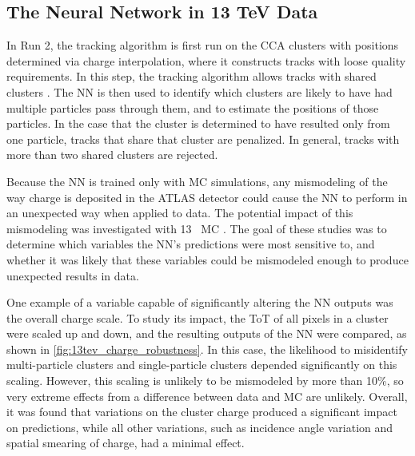 \subsection{The Neural Network in 13 TeV Data}

In Run 2, the tracking algorithm is first run on the \ac{CCA} clusters with positions determined via charge interpolation, where it constructs tracks with loose quality requirements. In this step, the tracking algorithm allows tracks with shared clusters \cite{ATL-PHYS-PUB-2015-044}. The \ac{NN} is then used to identify which clusters are likely to have had multiple particles pass through them, and to estimate the positions of those particles. In the case that the cluster is determined to have resulted only from one particle, tracks that share that cluster are penalized. In general, tracks with more than two shared clusters are rejected.

Because the \ac{NN} is trained only with \ac{MC} simulations, any mismodeling of the way charge is deposited in the \ac{ATLAS} detector could cause the \ac{NN} to perform in an unexpected way when applied to data. The potential impact of this mismodeling was investigated with 13 \tev~\ac{MC} \cite{ATL-PHYS-PUB-2015-052}. The goal of these studies was to determine which variables the \ac{NN}'s predictions were most sensitive to, and whether it was likely that these variables could be mismodeled enough to produce unexpected results in data. 

One example of a variable capable of significantly altering the \ac{NN} outputs was the overall charge scale. To study its impact, the \ac{ToT} of all pixels in a cluster were scaled up and down, and the resulting outputs of the \ac{NN} were compared, as shown in \autoref{fig:13tev_charge_robustness}. In this case, the likelihood to misidentify multi-particle clusters and single-particle clusters depended significantly on this scaling. However, this scaling is unlikely to be mismodeled by more than 10\%, so very extreme effects from a difference between data and \ac{MC} are unlikely. Overall, it was found that variations on the cluster charge produced a significant impact on predictions, while all other variations, such as incidence angle variation and spatial smearing of charge, had a minimal effect. 

